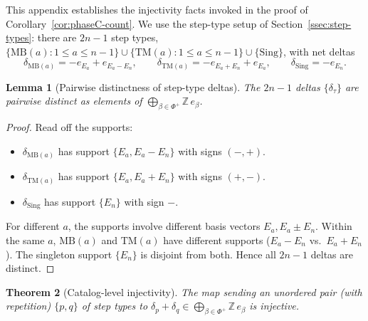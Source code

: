 \documentclass[11pt]{article}
\newtheorem{theorem}{Theorem}[section]
\newtheorem{lemma}[theorem]{Lemma}
\theoremstyle{definition}
\theoremstyle{remark}
\newcommand{\Sing}{\mathrm{Sing}}
\newcommand{\MB}{\mathrm{MB}}
\newcommand{\TM}{\mathrm{TM}}
\begin{document}
This appendix establishes the injectivity facts invoked in the proof of
Corollary~\ref{cor:phaseC-count}. We use the step-type setup of
Section~\ref{ssec:step-types}: there are $2n - 1$ step types,
$\{\MB(a) : 1 \leq a \leq n-1\} \cup \{\TM(a) : 1 \leq a \leq n-1\} \cup \{\Sing\}$,
with net deltas
\[
\delta_{\MB(a)} = -e_{E_a} + e_{E_a - E_n},
\qquad
\delta_{\TM(a)} = -e_{E_a + E_n} + e_{E_a},
\qquad
\delta_{\Sing} = -e_{E_n}.
\]

\begin{lemma}[Pairwise distinctness of step-type deltas]\label{lem:appendix-distinctness}
The $2n - 1$ deltas $\{\delta_\tau\}$ are pairwise distinct as elements of
$\bigoplus_{\beta \in \Phi^+} \mathbb{Z}\, e_\beta$.
\end{lemma}

\begin{proof}
Read off the supports:
\begin{itemize}[leftmargin=2em]
  \item $\delta_{\MB(a)}$ has support $\{E_a, E_a - E_n\}$ with signs $(-, +)$.
  \item $\delta_{\TM(a)}$ has support $\{E_a, E_a + E_n\}$ with signs $(+, -)$.
  \item $\delta_{\Sing}$ has support $\{E_n\}$ with sign $-$.
\end{itemize}
For different $a$, the supports involve different basis vectors $E_a, E_a \pm E_n$.
Within the same $a$, $\MB(a)$ and $\TM(a)$ have different supports
($E_a - E_n$ vs.~$E_a + E_n$). The singleton support $\{E_n\}$ is disjoint from
both. Hence all $2n - 1$ deltas are distinct.
\end{proof}

\begin{theorem}[Catalog-level injectivity]\label{thm:appendix-catalog-injectivity}
The map sending an unordered pair (with repetition) $\{p, q\}$ of step types to
$\delta_p + \delta_q \in \bigoplus_{\beta \in \Phi^+} \mathbb{Z}\, e_\beta$ is
injective.
\end{theorem}
\end{document}

